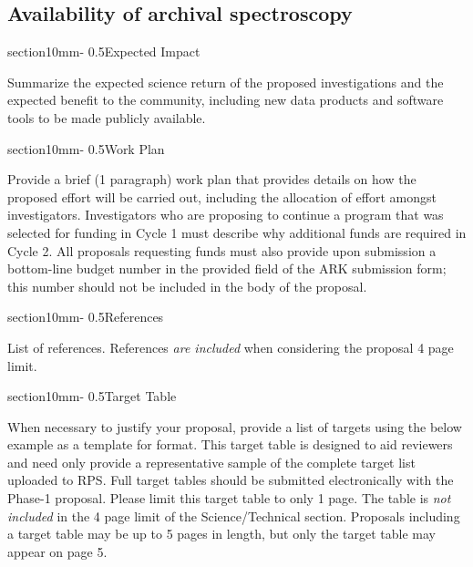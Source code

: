\documentclass[letterpaper,11pt]{article}
\makeatletter
\renewcommand{\section}{\@startsection%
{section}{1}{0mm}{-\baselineskip}%
{0.5\baselineskip}{\normalfont\Large\bfseries}}%
\makeatother
\begin{document}
\subsection{Availability of archival spectroscopy}


\section{Expected Impact}

Summarize the expected science return of the proposed investigations and the expected benefit
to the community, including new data products and software tools to be made publicly available.


\section{Work Plan}

Provide a brief (1 paragraph) work plan that provides details on how the proposed effort will be carried out, including the allocation of effort amongst investigators. Investigators who are proposing to continue a program that was selected for funding in Cycle 1 must describe why additional funds are required in Cycle 2. All proposals requesting funds must also provide upon submission a bottom-line budget number in the provided field of the ARK submission form; this number should not be included in the body of the proposal.

\section{References}

List of references. References {\it are included} when considering the proposal 4 page limit.



\section{Target Table}

When necessary to justify your proposal, provide a list of targets using the below example as
a template for format. This target table is designed to aid reviewers and need only provide a
representative sample of the complete target list uploaded to RPS. Full target tables should be
submitted electronically with the Phase-1 proposal. Please limit this target table to only 1 page.
The table is {\it not included} in the 4 page limit of the Science/Technical section. Proposals including
a target table may be up to 5 pages in length, but only the target table may appear on page 5.
\end{document}
